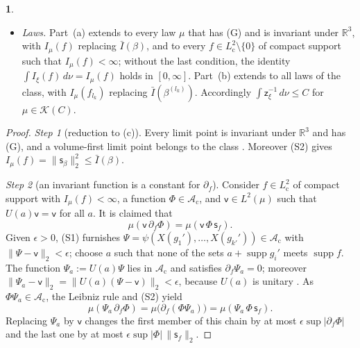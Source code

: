 \documentclass[11pt]{amsart}
\newcommand{\namedhead}{}
\theoremstyle{definition}
\newtheorem*{namedinner}{\namedhead}
\newenvironment{named}[1]{\renewcommand{\namedhead}{#1}\begin{namedinner}}{\end{namedinner}}
\begin{document}
\begin{named}{Theorem 7.1}
\begin{itemize}
\item[(c)] \emph{Laws.}
Part~(a) extends to every law $\mu$ that has (G) and is invariant under $\mathbb R^3$, with $I_\mu(f)$ replacing $\bar I(\beta)$, and to every $f\in L^2_{\mathrm c}\setminus\{0\}$ of compact support such that $I_\mu(f)<\infty$;
without the last condition, the identity $\int I_\xi(f)\,d\nu=I_\mu(f)$ holds in $[0,\infty]$.
Part~(b) extends to all laws of the class, with $I_\mu(f_{l_k})$ replacing $\bar I(\beta^{(l_k)})$.
Accordingly $\int\mathsf z_\xi^{-1}\,d\nu\le C$ for $\mu\in\mathcal K(C)$.
\end{itemize}
\end{named}

\begin{proof}
\emph{Step 1} (reduction to (c)).
Every limit point is invariant under $\mathbb R^3$ and has (G), and a volume-first limit point belongs to the class \cite[Theorem~1.3\,(a), (b)(i)]{QEDII}.
Moreover (S2) gives $I_\mu(f)=\|\mathsf s_\beta\|_2^2\le\bar I(\beta)$.

\emph{Step 2} (an invariant function is a constant for $\partial_f$).
Consider $f\in L^2_{\mathrm c}$ of compact support with $I_\mu(f)<\infty$, a function $\Phi\in\mathcal A_{\mathrm c}$, and $\mathsf v\in L^2(\mu)$ such that $U(a)\mathsf v=\mathsf v$ for all $a$.
It is claimed that
\begin{equation*}
\mu(\mathsf v\,\partial_f\Phi)=\mu(\mathsf v\,\Phi\,\mathsf s_f).
\end{equation*}
Given $\epsilon>0$, (S1) furnishes $\Psi=\psi(X(g_1'),\dots,X(g_{k'}'))\in\mathcal A_{\mathrm c}$ with $\|\Psi-\mathsf v\|_2<\epsilon$;
choose $a$ such that none of the sets $a+\operatorname{supp}g_i'$ meets $\operatorname{supp}f$.
The function $\Psi_a:=U(a)\Psi$ lies in $\mathcal A_{\mathrm c}$ and satisfies $\partial_f\Psi_a=0$;
moreover $\|\Psi_a-\mathsf v\|_2=\|U(a)(\Psi-\mathsf v)\|_2<\epsilon$, because $U(a)$ is unitary \cite[Proposition~45.1\,(5),~(11)]{QEDIII}.
As $\Phi\Psi_a\in\mathcal A_{\mathrm c}$, the Leibniz rule and (S2) yield
\begin{equation*}
\mu(\Psi_a\,\partial_f\Phi)=\mu\bigl(\partial_f(\Phi\Psi_a)\bigr)=\mu(\Psi_a\,\Phi\,\mathsf s_f).
\end{equation*}
Replacing $\Psi_a$ by $\mathsf v$ changes the first member of this chain by at most $\epsilon\sup|\partial_f\Phi|$ and the last one by at most $\epsilon\sup|\Phi|\,\|\mathsf s_f\|_2$.


\end{proof}
\end{document}
